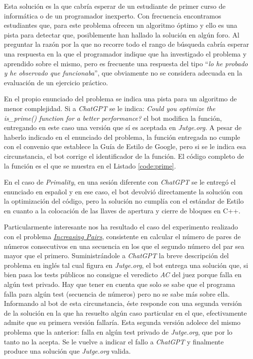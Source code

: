 \documentclass[twocolumn,twoside,a4paper, 10pt]{article}
\newcommand{\jutge}{\textit{Jutge.org}{}}           %
\newcommand{\ChatGPT}{\textit{ChatGPT}{}}           %
\begin{document}
Esta solución es la que cabría esperar de un estudiante de primer curso de informática o de un programador
inexperto.
Con frecuencia encontramos estudiantes que, para este problema ofrecen un algoritmo óptimo y ello es una pista 
para detectar que, posiblemente han hallado la solución en algún foro. 
Al preguntar la razón por la que no recorre todo el rango de búsqueda cabría esperar una
respuesta en la que el programador indique que ha investigado el problema y aprendido sobre el mismo, pero es
frecuente una respuesta del tipo ``\textit{lo he probado y he observado que funcionaba}'', que obviamente no se
considera adecuada en la evaluación de un ejercicio práctico.

En el propio enunciado del problema se indica una pista para un algoritmo de menor complejidad.
Si a \ChatGPT{} se le indica:
\textit{Could you optimize the is\_prime() function for a better performance?}
el bot modifica la función, entregando en este caso una versión que sí es aceptada en \textit{Jutge.org}.
A pesar de haberlo indicado en el enunciado del problema, la función entregada no cumple con el convenio que
establece la Guía de Estilo de Google, pero si se le indica esa circunstancia, el bot corrige el identificador
de la función. 
El código completo de la función es el que se muestra en el Listado \ref{code:prime}.


En el caso de \textit{Primality}, en una sesión diferente con \ChatGPT{} se le entregó el enunciado en español y
en ese caso, el bot devolvió directamente la solución con la optimización del código, pero la solución no cumplía
con el estándar de Estilo en cuanto a la colocación de las llaves de apertura y cierre de bloques en C++.

Particularmente interesante nos ha resultado el caso del experimento realizado con el problema
\href{https://jutge.org/problems/P73501_en/statement}{\textit{Increasing Pairs}}, 
consistente en calcular el número de pares de números consecutivos en una secuencia en los que el segundo
número del par sea mayor que el primero.
Suministrándole a \ChatGPT{} la breve descripción del problema en inglés tal cual figura en \jutge{}, el bot
entrega una solución que, si bien pasa los tests públicos no consigue el veredicto \textit{AC} del juez porque
falla en algún test privado.
Hay que tener en cuenta que solo se sabe que el programa falla para algún test (secuencia de números) pero no
se sabe más sobre ella.
Informando al bot de esta circunstancia, éste responde con una segunda versión de la solución en la que ha
resuelto algún caso particular en el que, efectivamente admite que su primera versión fallaría.
Esta segunda versión adolece del mismo problema que la anterior: falla en algún test privado de \jutge{}, que
por lo tanto no la acepta.
Se le vuelve a indicar el fallo a \ChatGPT{} y finalmente produce una solución que \jutge{} valida.
\end{document}
